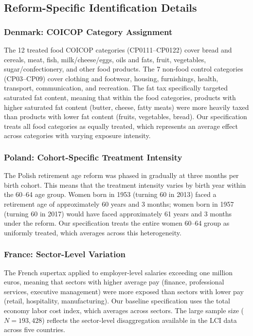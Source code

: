 \documentclass[12pt]{article}
\begin{document}
\subsection{Reform-Specific Identification Details}

\subsubsection{Denmark: COICOP Category Assignment}

The 12 treated food COICOP categories (CP0111--CP0122) cover bread and cereals, meat, fish, milk/cheese/eggs, oils and fats, fruit, vegetables, sugar/confectionery, and other food products. The 7 non-food control categories (CP03--CP09) cover clothing and footwear, housing, furnishings, health, transport, communication, and recreation. The fat tax specifically targeted saturated fat content, meaning that within the food categories, products with higher saturated fat content (butter, cheese, fatty meats) were more heavily taxed than products with lower fat content (fruits, vegetables, bread). Our specification treats all food categories as equally treated, which represents an average effect across categories with varying exposure intensity.

\subsubsection{Poland: Cohort-Specific Treatment Intensity}

The Polish retirement age reform was phased in gradually at three months per birth cohort. This means that the treatment intensity varies by birth year within the 60--64 age group. Women born in 1953 (turning 60 in 2013) faced a retirement age of approximately 60 years and 3 months; women born in 1957 (turning 60 in 2017) would have faced approximately 61 years and 3 months under the reform. Our specification treats the entire women 60--64 group as uniformly treated, which averages across this heterogeneity.

\subsubsection{France: Sector-Level Variation}

The French supertax applied to employer-level salaries exceeding one million euros, meaning that sectors with higher average pay (finance, professional services, executive management) were more exposed than sectors with lower pay (retail, hospitality, manufacturing). Our baseline specification uses the total economy labor cost index, which averages across sectors. The large sample size ($N = 193,428$) reflects the sector-level disaggregation available in the LCI data across five countries.
\end{document}

